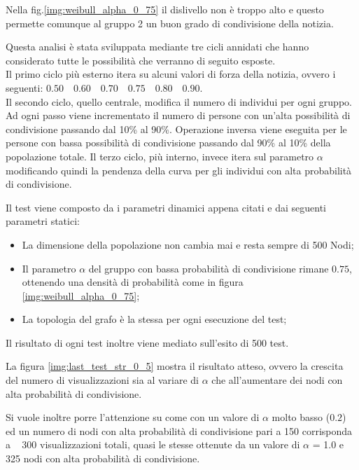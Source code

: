 Nella fig.\ref{img:weibull_alpha_0_75} il dislivello non è troppo alto e questo permette 
comunque al gruppo 2 un buon grado di condivisione della notizia.

Questa analisi è stata sviluppata mediante tre cicli annidati che hanno considerato tutte le 
possibilità che verranno di seguito esposte.\\
Il primo ciclo più esterno itera su alcuni valori di forza della notizia, 
ovvero i seguenti: $0.50 \quad 0.60 \quad 0.70 \quad 0.75 \quad 0.80 \quad 0.90$.\\
Il secondo ciclo, quello centrale, modifica il numero di individui per ogni gruppo. 
Ad ogni passo viene incrementato il numero di persone con un'alta possibilità di condivisione 
passando dal 10\% al 90\%. Operazione inversa viene eseguita per le persone con bassa possibilità di 
condivisione passando dal 90\% al 10\% della popolazione totale.
Il terzo ciclo, più interno, invece itera sul parametro $\alpha$ modificando quindi la pendenza della 
curva per gli individui con alta probabilità di condivisione.

Il test viene composto da i parametri dinamici appena citati e dai seguenti parametri statici:
\begin{itemize}
\item La dimensione della popolazione non cambia mai e resta sempre di 500 Nodi;
\item Il parametro $\alpha$ del gruppo con bassa probabilità di condivisione rimane $0.75$, 
ottenendo una densità di probabilità come in figura \ref{img:weibull_alpha_0_75};
\item La topologia del grafo è la stessa per ogni esecuzione del test;
\end{itemize}

Il risultato di ogni test inoltre viene mediato sull'esito di 500 test.

La figura \ref{img:last_test_str_0_5} mostra il risultato atteso, 
ovvero la crescita del numero di visualizzazioni sia al variare di $\alpha$ che all'aumentare 
dei nodi con alta probabilità di condivisione.

Si vuole inoltre porre l'attenzione su come con un valore di $\alpha$ 
molto basso ($0.2$) ed un numero di nodi con alta probabilità di condivisione pari a 150 corrisponda 
a ~ 300 visualizzazioni totali, quasi le stesse ottenute da un valore di $\alpha$ = 1.0 e 325 nodi con 
alta probabilità di condivisione.




